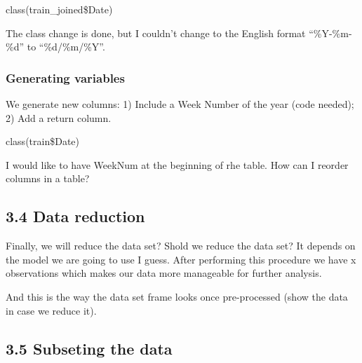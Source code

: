 \documentclass[11pt,]{article}
\newenvironment{Shaded}{\begin{snugshade}}{\end{snugshade}}
\newcommand{\KeywordTok}[1]{\textcolor[rgb]{0.13,0.29,0.53}{\textbf{{#1}}}}
\newcommand{\DecValTok}[1]{\textcolor[rgb]{0.00,0.00,0.81}{{#1}}}
\newcommand{\StringTok}[1]{\textcolor[rgb]{0.31,0.60,0.02}{{#1}}}
\newcommand{\CommentTok}[1]{\textcolor[rgb]{0.56,0.35,0.01}{\textit{{#1}}}}
\newcommand{\NormalTok}[1]{{#1}}
\begin{document}
\begin{Shaded}
\end{Shaded}

class(train\_joined\$Date)

The class change is done, but I couldn't change to the English format
``\%Y-\%m-\%d'' to ``\%d/\%m/\%Y''.

\subsubsection{Generating variables}\label{generating-variables}

We generate new columns: 1) Include a Week Number of the year (code
needed); 2) Add a return column.

class(train\$Date)

\begin{Shaded}
\end{Shaded}

I would like to have WeekNum at the beginning of rhe table. How can I
reorder columns in a table?

\subsection{3.4 Data reduction}\label{data-reduction}

Finally, we will reduce the data set? Shold we reduce the data set? It
depends on the model we are going to use I guess. After performing this
procedure we have x observations which makes our data more manageable
for further analysis.

And this is the way the data set frame looks once pre-processed (show
the data in case we reduce it).

\subsection{3.5 Subseting the data}\label{subseting-the-data}
\end{document}
